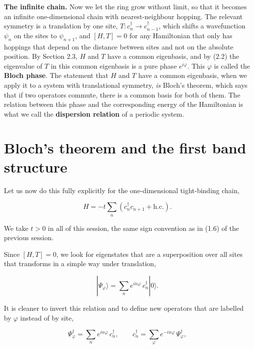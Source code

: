 \textbf{The infinite chain.} Now we let the ring grow without limit, so that it becomes an infinite
one-dimensional chain with nearest-neighbour hopping. The relevant symmetry is a translation by one
site, $T: c_n^\dagger \to c_{n-1}^\dagger$, which shifts a wavefunction $\psi_n$ on the sites to $\psi_{n+1}$, and $[H,T]=0$ for any Hamiltonian that only has hoppings that depend on
the distance between sites and not on the absolute position. By Section 2.3, $H$ and $T$ have a
common eigenbasis, and by (2.2) the eigenvalue of $T$ in this common eigenbasis is a pure phase
$e^{i\varphi}$. This $\varphi$ is called the \textbf{Bloch phase}. The statement that $H$ and $T$
have a common eigenbasis, when we apply it to a system with translational symmetry, \emph{is}
Bloch's theorem, which says that if two operators commute, there is a common basis for both of them.
The relation between this phase and the corresponding energy of the Hamiltonian is what we call the
\textbf{dispersion relation} of a periodic system.

\section{Bloch's theorem and the first band structure}

Let us now do this fully explicitly for the one-dimensional tight-binding chain,

\begin{equation}H = -t\sum_n \left(c_n^\dagger c_{n+1} + \text{h.c.}\right).\end{equation}

We take $t>0$ in all of this session, the same sign convention as in (1.6) of the previous
session.

Since $[H,T]=0$, we look for eigenstates that are a superposition over all sites that transforms in a
simple way under translation,

\begin{equation}|\Psi_\varphi\rangle = \sum_n e^{in\varphi}\, c_n^\dagger|0\rangle.\end{equation}

It is cleaner to invert this relation and to define new operators that are labelled by $\varphi$
instead of by site,

\begin{equation}\Psi_\varphi^\dagger = \sum_n e^{in\varphi}\, c_n^\dagger, \qquad
c_n^\dagger = \sum_\varphi e^{-in\varphi}\, \Psi_\varphi^\dagger,\end{equation}

